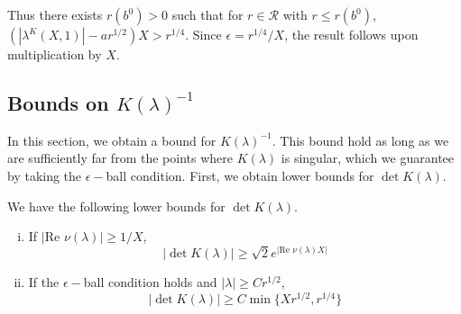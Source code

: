 \documentclass[thesis.tex]{subfiles}
\begin{document}
Thus there exists $r(b^0) > 0$ such that for $r \in \mathcal{R}$ with $r \leq r(b^0)$, $(|\lambda^K(X,1)| - a r^{1/2})X > r^{1/4}$. Since $\epsilon = r^{1/4}/X$, the result follows upon multiplication by $X$.

\subsection{Bounds on \texorpdfstring{$K(\lambda)^{-1}$}{inverse of K} }

In this section, we obtain a bound for $K(\lambda)^{-1}$. This bound hold as long as we are sufficiently far from the points where $K(\lambda)$ is singular, which we guarantee by taking the $\epsilon-$ball condition. First, we obtain lower bounds for $\det K(\lambda)$. 

\begin{lemma}\label{detKlemma}
We have the following lower bounds for $\det K(\lambda)$.
\begin{enumerate}[(i)]
\item If $|\text{Re }\nu(\lambda)| \geq 1/X$, 
\begin{equation}\label{detKbound1}
|\det K(\lambda)| \geq \sqrt{2} e^{|\text{Re }\nu(\lambda)X|}
\end{equation}
\item If the $\epsilon-$ball condition holds and $|\lambda| \geq C r^{1/2}$,
\begin{equation}\label{detKbound2}
|\det K(\lambda)|\geq C \min\{ X r^{1/2}, r^{1/4} \}
\end{equation}
\end{enumerate}


\end{lemma}
\end{document}
